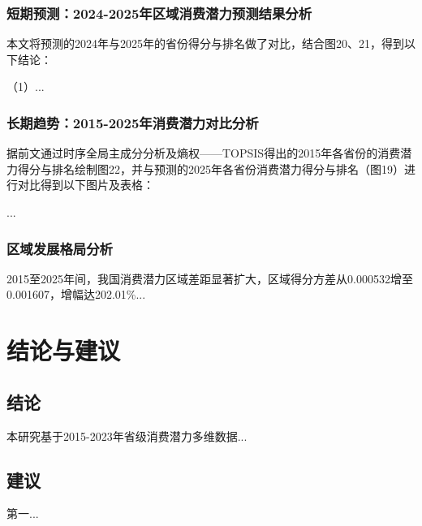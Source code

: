\documentclass[UTF8,a4paper,zihao=-4,AutoFakeBold]{ctexart}
\begin{document}
    \subsubsection{短期预测：2024-2025年区域消费潜力预测结果分析}
    本文将预测的2024年与2025年的省份得分与排名做了对比，结合图20、21，得到以下结论：
    
    （1）...
     
     
     \subsubsection{长期趋势：2015-2025年消费潜力对比分析}
     据前文通过时序全局主成分分析及熵权——TOPSIS得出的2015年各省份的消费潜力得分与排名绘制图22，并与预测的2025年各省份消费潜力得分与排名（图19）进行对比得到以下图片及表格：
    
   ...
    
    \subsubsection{区域发展格局分析}
    2015至2025年间，我国消费潜力区域差距显著扩大，区域得分方差从0.000532增至0.001607，增幅达202.01\%...
    
    \section{结论与建议}
    \subsection{结论}
    本研究基于2015-2023年省级消费潜力多维数据...
    
    \subsection{建议}
    第一...
    
\end{document}
